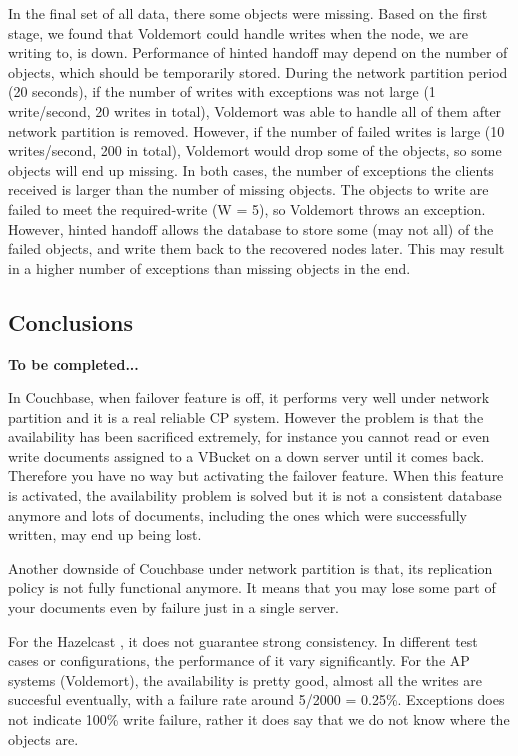 \documentclass[a4paper]{article}
\begin{document}
In the final set of all data, there some objects were missing. 
Based on the first stage, we found that Voldemort could handle writes when the node, we are writing to, is down. 
Performance of hinted handoff may depend on the number of objects, which should be temporarily stored. 
During the network partition period (20 seconds), if the number of writes with exceptions was not large (1 write/second, 20 writes in total), Voldemort was able to handle all of them after network partition is removed. 
However, if the number of failed writes is large (10 writes/second, 200 in total), Voldemort would drop some of the objects, so some objects will end up missing. 
In both cases, the number of exceptions the clients received is larger than the number of missing objects. 
The objects to write are failed to meet the required-write (W = 5), so Voldemort throws an exception. 
However, hinted handoff allows the database to store some (may not all) of the failed objects, and write them back to the recovered nodes later. 
This may result in a higher number of exceptions than missing objects in the end.

\subsection{Conclusions}

{\bf To be completed...}

In Couchbase, when failover feature is off, it performs very well under network partition and it is a real reliable CP system.
However the problem is that the availability has been sacrificed extremely, for instance you cannot read or even write documents assigned to a VBucket on a down server until it comes back.
Therefore you have no way but activating the failover feature. 
When this feature is activated, the availability problem is solved but it is not a consistent database anymore and lots of documents, including the ones which were successfully written, may end up being lost. 

Another downside of Couchbase under network partition is that, its replication policy is not fully functional anymore.
It means that you may lose some part of your documents even by failure just in a single server.

For the Hazelcast , it does not guarantee strong consistency. In different test cases or configurations, the performance of it
vary significantly.
For the AP systems (Voldemort), the availability is pretty good, almost all the writes are succesful eventually, with a failure rate around 5/2000 = 0.25\%.
Exceptions does not indicate 100\% write failure, rather it does say that we do not know where the objects are.
\end{document}
